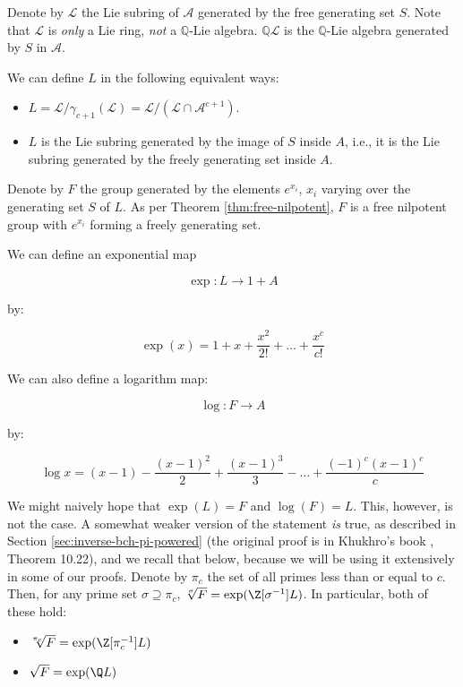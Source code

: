 \documentclass{ucetd}
\begin{document}
Denote by $\mathcal{L}$ the Lie subring of $\mathcal{A}$ generated by
the free generating set $S$. Note that $\mathcal{L}$ is {\em only} a
Lie ring, {\em not} a $\mathbb{Q}$-Lie
algebra. $\mathbb{Q}\mathcal{L}$ is the $\mathbb{Q}$-Lie algebra
generated by $S$ in $\mathcal{A}$.

We can define $L$ in the following equivalent ways:

\begin{itemize}
\item $L = \mathcal{L}/\gamma_{c+1}(\mathcal{L}) =
  \mathcal{L}/(\mathcal{L} \cap \mathcal{A}^{c+1})$.
\item $L$ is the Lie subring generated by the image of $S$ inside $A$,
  i.e., it is the Lie subring generated by the freely generating set
  inside $A$.
\end{itemize}

Denote by $F$ the group generated by the elements $e^{x_i}$, $x_i$
varying over the generating set $S$ of $L$. As per Theorem
\ref{thm:free-nilpotent}, $F$ is a free nilpotent group with $e^{x_i}$
forming a freely generating set.

We can define an exponential map

$$\exp:L \to 1 + A$$

by:

$$\exp(x) = 1 + x + \frac{x^2}{2!} + \dots + \frac{x^c}{c!}$$

We can also define a logarithm map:

$$\log:F \to A$$

by:

$$\log x = (x - 1) - \frac{(x - 1)^2}{2} + \frac{(x - 1)^3}{3} - \dots + \frac{(-1)^c(x - 1)^c}{c}$$

We might naively hope that $\exp(L) = F$ and $\log(F) = L$. This,
however, is not the case. A somewhat weaker version of the statement
{\em is} true, as described in Section
\ref{sec:inverse-bch-pi-powered} (the original proof is in Khukhro's
book \cite{Khukhro}, Theorem 10.22), and we recall that below, because
we will be using it extensively in some of our proofs. Denote by
$\pi_c$ the set of all primes less than or equal to $c$. Then, for any
prime set $\sigma \supseteq \pi_c$, $\sqrt[\sigma]{F} =
\exp(\Z[\sigma^{-1}]L)$. In particular, both of these hold:

\begin{itemize}
\item $\sqrt[\pi_c]{F} = \exp(\Z[\pi_c^{-1}]L)$
\item $\sqrt{F} = \exp(\Q L)$ 
\end{itemize}
\end{document}
